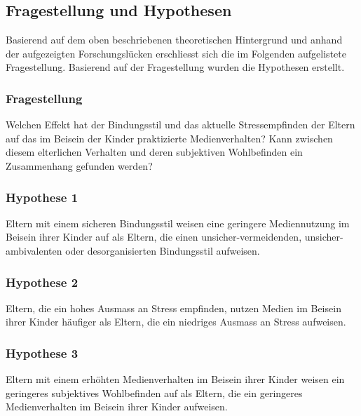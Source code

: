 \subsection{Fragestellung und Hypothesen} \label{sec:Fragestellung}
Basierend auf dem oben beschriebenen theoretischen Hintergrund und anhand der aufgezeigten Forschungslücken erschliesst sich die im Folgenden aufgelistete Fragestellung. Basierend auf der Fragestellung wurden die Hypothesen erstellt.
\subsubsection{Fragestellung} 
Welchen Effekt hat der Bindungsstil und das aktuelle Stressempfinden der Eltern auf das im Beisein der Kinder praktizierte Medienverhalten? Kann zwischen diesem elterlichen Verhalten und deren subjektiven Wohlbefinden ein Zusammenhang gefunden werden?
\subsubsection{Hypothese 1}
Eltern mit einem sicheren Bindungsstil weisen eine geringere Mediennutzung im Beisein ihrer Kinder auf als Eltern, die einen unsicher-vermeidenden, unsicher-ambivalenten oder desorganisierten Bindungsstil aufweisen.
\subsubsection{Hypothese 2}
Eltern, die ein hohes Ausmass an Stress empfinden, nutzen Medien im Beisein ihrer Kinder häufiger als Eltern, die ein niedriges Ausmass an Stress aufweisen.
\subsubsection{Hypothese 3}
Eltern mit einem erhöhten Medienverhalten im Beisein ihrer Kinder weisen ein geringeres subjektives Wohlbefinden auf als Eltern, die ein geringeres Medienverhalten im Beisein ihrer Kinder aufweisen.

